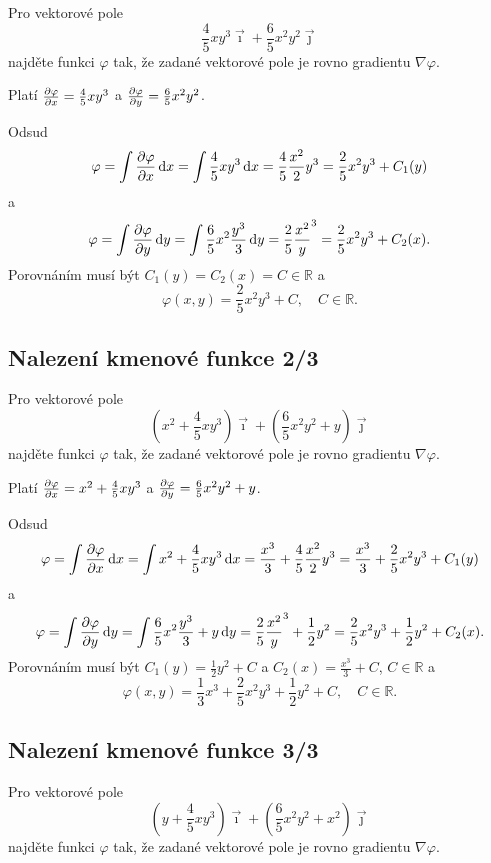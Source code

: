 Pro vektorové pole $$\frac 45 x y^3\vec \imath + \frac 65x^2y^2\vec\jmath$$ najděte funkci $\varphi$ tak, že zadané vektorové pole je rovno gradientu $\nabla \varphi.$

\reseni

Platí $\pdv {\varphi}{x}=\frac 45 xy^3$ a $\pdv{\varphi}{y}=\frac 65 x^2y^2$.

Odsud
$$\varphi =\int \pdv{\varphi}{x} \,\mathrm dx=\int \frac 45 xy^3 \,\mathrm dx
=\frac 45 \frac {x^2}{2}y^3=\frac 25 x^2y^3+C_1(y)$$
a
$$\varphi =\int \pdv{\varphi}{y} \,\mathrm dy=\int \frac 65 x^2\frac{y^3}{3} \,\mathrm dy
=\frac 25 \frac {x^2}y^3=\frac 25 x^2y^3+C_2(x).$$
Porovnáním musí být $C_1(y)=C_2(x)=C\in\mathbb R$ a
$$\varphi(x,y)=\frac 25 x^2y^3+C,\quad C\in\mathbb R.$$


\konec

\subsection{Nalezení kmenové funkce 2/3}

Pro vektorové pole $$\left(x^2+\frac 45 x y^3\right)\vec \imath + \left(\frac 65x^2y^2+y\right)\vec\jmath$$ najděte funkci $\varphi$ tak, že zadané vektorové pole je rovno gradientu $\nabla \varphi.$

\reseni

Platí $\pdv {\varphi}{x}=x^2+\frac 45 xy^3$ a $\pdv{\varphi}{y}=\frac 65 x^2y^2+y$.

Odsud
$$\varphi =\int \pdv{\varphi}{x} \,\mathrm dx=\int x^2+\frac 45 xy^3 \,\mathrm dx
=\frac {x^3}3+\frac 45 \frac {x^2}{2}y^3=\frac {x^3}3+\frac 25 x^2y^3+C_1(y)$$
a
$$\varphi =\int \pdv{\varphi}{y} \,\mathrm dy=\int \frac 65 x^2\frac{y^3}{3} +y \,\mathrm dy
=\frac 25 \frac {x^2}y^3+\frac 12 y^2=\frac 25 x^2y^3+\frac 12 y^2 + C_2(x).$$
Porovnáním musí být $C_1(y)=\frac 12 y^2+C$ a $C_2(x)=\frac {x^3}3+C$, $C\in\mathbb R$ a
$$\varphi(x,y)=\frac {1}{3}x^3+\frac 25 x^2y^3+\frac 12 y^2+C,\quad C\in\mathbb R.$$

\konec

\subsection{Nalezení kmenové funkce 3/3}

Pro vektorové pole $$\left(y+\frac 45 x y^3\right)\vec \imath + \left(\frac 65x^2y^2+x^2\right)\vec\jmath$$ najděte funkci $\varphi$ tak, že zadané vektorové pole je rovno gradientu $\nabla \varphi.$



